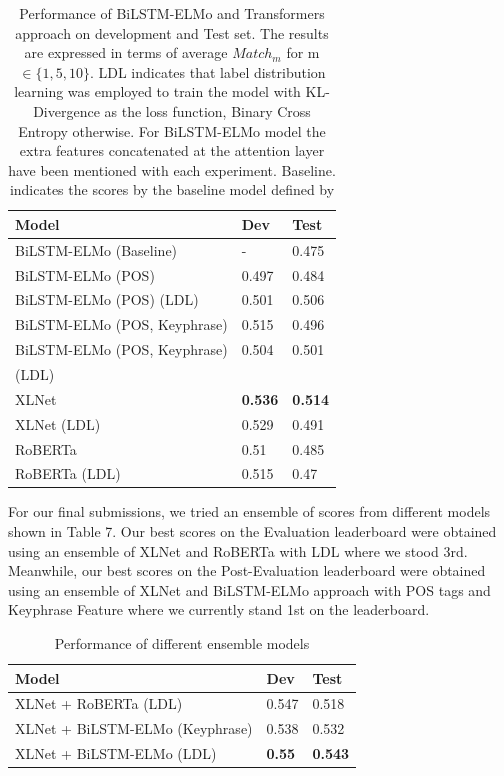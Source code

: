 \documentclass[letterpaper]{article}
\begin{document}
\begin{table}[h!]
\centering
\begin{tabular}{ |l|l|l| }
\hline
\textbf{Model} & \textbf{Dev} & \textbf{Test} \\
\hline
BiLSTM-ELMo (Baseline)  & - & 0.475 \\
\hline
BiLSTM-ELMo (POS)  & 0.497 & 0.484 \\
\hline
BiLSTM-ELMo (POS) (LDL) & 0.501 & 0.506 \\
\hline
BiLSTM-ELMo (POS, Keyphrase) & 0.515 & 0.496 \\
\hline
BiLSTM-ELMo (POS, Keyphrase) & 0.504 & 0.501 \\
(LDL) & & \\
\hline
XLNet & \textbf{0.536} & \textbf{0.514} \\
\hline
XLNet (LDL) & 0.529 & 0.491 \\
\hline
RoBERTa & 0.51 & 0.485\\
\hline
RoBERTa (LDL) & 0.515 & 0.47 \\
\hline
\end{tabular}

\caption{Performance of BiLSTM-ELMo and Transformers approach on development and Test set. The results are expressed in terms of average $Match_m$ for m $\in \{1,5,10\}$. LDL indicates that label distribution learning was employed to train the model with KL-Divergence as the loss function, Binary Cross Entropy otherwise. For BiLSTM-ELMo model the extra features concatenated at the attention layer have been mentioned with each experiment. Baseline. indicates the scores by the baseline model defined by \citet{shirani2019learning}}
\label{table:5}
\end{table}
For our final submissions, we tried an ensemble of scores from different models shown in Table 7. Our best scores on the Evaluation leaderboard were obtained using an ensemble of XLNet and RoBERTa with LDL where we stood 3rd. Meanwhile, our best scores on the Post-Evaluation leaderboard were obtained using an ensemble of XLNet and BiLSTM-ELMo approach with POS tags and Keyphrase Feature where we currently stand 1st on the leaderboard.

\begin{table}[h!]
\centering
\begin{adjustbox}{width=0.79\columnwidth}
\begin{tabular}{|l|l|l|}
\hline
\textbf{Model} & \textbf{Dev} & \textbf{Test}  \\
\hline
XLNet + RoBERTa (LDL) & 0.547 & 0.518 \\
\hline
XLNet + BiLSTM-ELMo (Keyphrase)& 0.538 & 0.532 \\
\hline
XLNet + BiLSTM-ELMo (LDL) & \textbf{0.55} & \textbf{0.543} \\
\hline
\end{tabular}
\end{adjustbox}
\caption{Performance of different ensemble models}
\label{table:6}
\end{table}
\end{document}
